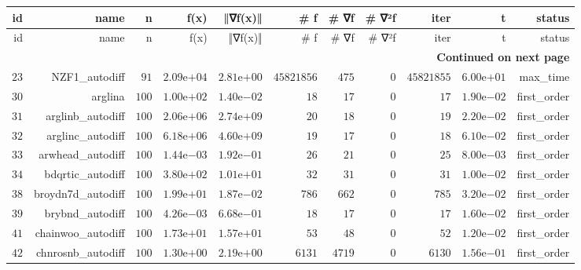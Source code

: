 \documentclass[varwidth=20cm,crop=true]{standalone}
\begin{document}
\begin{longtable}{rrrrrrrrrrr}
  \hline
  id & name & n & f(x) & ‖∇f(x)‖ & # f & # ∇f & # ∇²f & iter & t & status \\\hline
  \endfirsthead
  \hline
  id & name & n & f(x) & ‖∇f(x)‖ & # f & # ∇f & # ∇²f & iter & t & status \\\hline
  \endhead
  \hline
  \multicolumn{11}{r}{{\bfseries Continued on next page}}\\
  \hline
  \endfoot
  \endlastfoot
  \(    23\) & NZF1\_autodiff & \(    91\) & \( 2.09\)e\(+04\) & \( 2.81\)e\(+00\) & \(45821856\) & \(   475\) & \(     0\) & \(45821855\) & \( 6.00\)e\(+01\) & max\_time \\
  \(    30\) & arglina & \(   100\) & \( 1.00\)e\(+02\) & \( 1.40\)e\(-02\) & \(    18\) & \(    17\) & \(     0\) & \(    17\) & \( 1.90\)e\(-02\) & first\_order \\
  \(    31\) & arglinb\_autodiff & \(   100\) & \( 2.06\)e\(+06\) & \( 2.74\)e\(+09\) & \(    20\) & \(    18\) & \(     0\) & \(    19\) & \( 2.20\)e\(-02\) & first\_order \\
  \(    32\) & arglinc\_autodiff & \(   100\) & \( 6.18\)e\(+06\) & \( 4.60\)e\(+09\) & \(    19\) & \(    17\) & \(     0\) & \(    18\) & \( 6.10\)e\(-02\) & first\_order \\
  \(    33\) & arwhead\_autodiff & \(   100\) & \( 1.44\)e\(-03\) & \( 1.92\)e\(-01\) & \(    26\) & \(    21\) & \(     0\) & \(    25\) & \( 8.00\)e\(-03\) & first\_order \\
  \(    34\) & bdqrtic\_autodiff & \(   100\) & \( 3.80\)e\(+02\) & \( 1.01\)e\(+01\) & \(    32\) & \(    31\) & \(     0\) & \(    31\) & \( 1.00\)e\(-02\) & first\_order \\
  \(    38\) & broydn7d\_autodiff & \(   100\) & \( 1.99\)e\(+01\) & \( 1.87\)e\(-02\) & \(   786\) & \(   662\) & \(     0\) & \(   785\) & \( 3.20\)e\(-02\) & first\_order \\
  \(    39\) & brybnd\_autodiff & \(   100\) & \( 4.26\)e\(-03\) & \( 6.68\)e\(-01\) & \(    18\) & \(    17\) & \(     0\) & \(    17\) & \( 1.60\)e\(-02\) & first\_order \\
  \(    41\) & chainwoo\_autodiff & \(   100\) & \( 1.73\)e\(+01\) & \( 1.57\)e\(+01\) & \(    53\) & \(    48\) & \(     0\) & \(    52\) & \( 1.20\)e\(-02\) & first\_order \\
  \(    42\) & chnrosnb\_autodiff & \(   100\) & \( 1.30\)e\(+00\) & \( 2.19\)e\(+00\) & \(  6131\) & \(  4719\) & \(     0\) & \(  6130\) & \( 1.56\)e\(-01\) & first\_order \\

\end{longtable}
\end{document}
